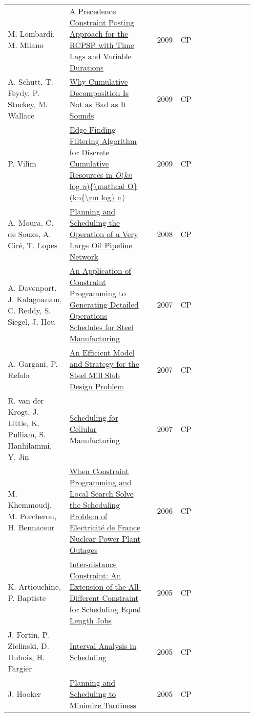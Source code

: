 \documentclass[a4paper]{article}
\begin{document}
{\begin{longtable}{p{3cm}p{6cm}rrcrlcccp{1.5cm}l}
M. Lombardi, M. Milano& \href{papers/LombardiM09.pdf}{A Precedence Constraint Posting Approach for the {RCPSP} with Time Lags and Variable Durations} & \cite{LombardiM09} & 2009 & CP & & & & & & & \\
A. Schutt, T. Feydy, P. Stuckey, M. Wallace& \href{papers/SchuttFSW09.pdf}{Why Cumulative Decomposition Is Not as Bad as It Sounds} & \cite{SchuttFSW09} & 2009 & CP & & & & & & & \\
P. Vil{\'{\i}}m& \href{papers/Vilim09.pdf}{Edge Finding Filtering Algorithm for Discrete Cumulative Resources in \emph{O}(\emph{kn} log \emph{n})\{{\textbackslash}mathcal O\}(kn\{{\textbackslash}rm log\} n)} & \cite{Vilim09} & 2009 & CP & & & & & & & \\
A. Moura, C. de Souza, A. Cir{\'{e}}, T. Lopes& \href{papers/MouraSCL08.pdf}{Planning and Scheduling the Operation of a Very Large Oil Pipeline Network} & \cite{MouraSCL08} & 2008 & CP & & & & & & & \\
A. Davenport, J. Kalagnanam, C. Reddy, S. Siegel, J. Hou& \href{papers/DavenportKRSH07.pdf}{An Application of Constraint Programming to Generating Detailed Operations Schedules for Steel Manufacturing} & \cite{DavenportKRSH07} & 2007 & CP & & & & & & & \\
A. Gargani, P. Refalo& \href{papers/GarganiR07.pdf}{An Efficient Model and Strategy for the Steel Mill Slab Design Problem} & \cite{GarganiR07} & 2007 & CP & & & & & & & \\
R. van der Krogt, J. Little, K. Pulliam, S. Hanhilammi, Y. Jin& \href{papers/KrogtLPHJ07.pdf}{Scheduling for Cellular Manufacturing} & \cite{KrogtLPHJ07} & 2007 & CP & & & & & & & \\
M. Khemmoudj, M. Porcheron, H. Bennaceur& \href{papers/KhemmoudjPB06.pdf}{When Constraint Programming and Local Search Solve the Scheduling Problem of Electricit{\'{e}} de France Nuclear Power Plant Outages} & \cite{KhemmoudjPB06} & 2006 & CP & & & & & & & \\
K. Artiouchine, P. Baptiste& \href{papers/ArtiouchineB05.pdf}{Inter-distance Constraint: An Extension of the All-Different Constraint for Scheduling Equal Length Jobs} & \cite{ArtiouchineB05} & 2005 & CP & & & & & & & \\
J. Fortin, P. Zielinski, D. Dubois, H. Fargier& \href{papers/FortinZDF05.pdf}{Interval Analysis in Scheduling} & \cite{FortinZDF05} & 2005 & CP & & & & & & & \\
J. Hooker& \href{papers/cp-Hooker05.pdf}{Planning and Scheduling to Minimize Tardiness} & \cite{cp-Hooker05} & 2005 & CP & & & & & & & \\

\end{longtable}}
\end{document}
